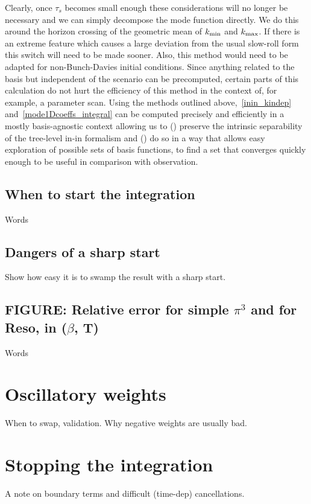 Clearly, once $\tau_s$ becomes small enough these considerations will no longer be necessary
and we can simply decompose the mode function directly.
We do this around the horizon crossing of the geometric mean of ${k_\text{min}}$ and ${k_\text{max}}$.
If there is an extreme feature which causes a large deviation from the usual slow-roll form
this switch will need to be made sooner. 
Also, this method would need to be adapted for non-Bunch-Davies initial conditions.
Since anything related to the basis but independent of the scenario can be
precomputed, certain parts of this calculation do not hurt the efficiency of this
method in the context of, for example, a parameter scan.
Using the methods outlined above,~\eqref{inin_kindep} and~\eqref{mode1Dcoeffs_integral}
can be computed precisely and efficiently in a mostly basis-agnostic context
allowing us to ({}) preserve the intrinsic separability of the tree-level
in-in formalism and ({}) do so in a way that allows easy exploration of possible
sets of basis functions, to find a set that converges quickly enough to
be useful in comparison with observation.
    \subsection{When to start the integration}
    Words
    \subsection{Dangers of a sharp start}
    Show how easy it is to swamp the result with a sharp start.
    \newpage
    \subsection{FIGURE: Relative error for simple $\pi^3$ and for Reso, in ($\beta$, T)}
    Words
    \newpage
\section{Oscillatory weights}
    When to swap, validation.
    Why negative weights are usually bad.
    \newpage
\section{Stopping the integration}
    A note on boundary terms and difficult (time-dep) cancellations.
    \newpage
